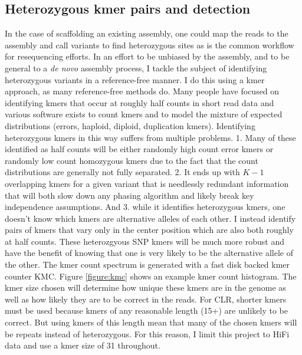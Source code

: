 \subsection{Heterozygous kmer pairs and detection}
\par{
In the case of scaffolding an existing assembly, one could map the reads to the assembly and call variants to find heterozygous sites as is the common workflow for resequencing efforts. In an effort to be unbiased by the 
assembly, and to be general to a \textit{de novo} assembly process, I tackle the subject of identifying heterozygous variants in a reference-free manner. I do this using a kmer approach, as many reference-free methods do. 
Many people have focused on identifying kmers that occur at roughly half counts in short read data\cite{KAT} and various software exists to count kmers\cite{jellyfish} 
and to model the mixture of expected distributions (errors, haploid, diploid, duplication kmers)\cite{genomescope}. Identifying heterozygous kmers in this way 
suffers from multiple problems. 1. Many of these identified as half counts will be either randomly high count error kmers or randomly low count 
homozygous kmers due to the fact that the count distributions are generally not fully separated. 2. It ends up with $K-1$ overlapping kmers for a given variant that is needlessly redundant information that will both slow down any phasing algorithm and 
likely break key independence assumptions. And 3. while it identifies heterozygous kmers, one doesn't know which kmers are alternative alleles of each other. 
I instead identify pairs of kmers that vary only in the center position which are also both roughly at half counts. These heterozgyous SNP kmers 
will be much more robust and have the benefit of knowing that one is very likely to be the alternative allele of the other. The kmer count spectrum is generated with a fast disk backed kmer counter KMC\cite{kmc}\cite{kmc2}\cite{kmc3}. Figure \ref{figure:kmc} shows an example kmer count histogram. The kmer size chosen will determine how unique these kmers are in the genome as well as how likely they are to be correct in the reads. For CLR, shorter kmers must be used because kmers of any reasonable length (15+) are unlikely to be correct. But using kmers of this length mean that many of the chosen kmers will be repeats instead of heterozygous. For this reason, I limit this project to HiFi data and use a kmer size of 31 throughout.
}

